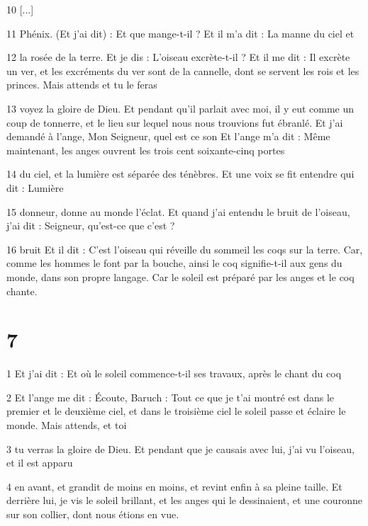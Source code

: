 \par 10 [...]

\par 11 Phénix. (Et j'ai dit) : Et que mange-t-il ? Et il m'a dit : La manne du ciel et

\par 12 la rosée de la terre. Et je dis : L'oiseau excrète-t-il ? Et il me dit : Il excrète un ver, et les excréments du ver sont de la cannelle, dont se servent les rois et les princes. Mais attends et tu le feras

\par 13 voyez la gloire de Dieu. Et pendant qu'il parlait avec moi, il y eut comme un coup de tonnerre, et le lieu sur lequel nous nous trouvions fut ébranlé. Et j'ai demandé à l'ange, Mon Seigneur, quel est ce son Et l'ange m'a dit : Même maintenant, les anges ouvrent les trois cent soixante-cinq portes

\par 14 du ciel, et la lumière est séparée des ténèbres. Et une voix se fit entendre qui dit : Lumière

\par 15 donneur, donne au monde l'éclat. Et quand j'ai entendu le bruit de l'oiseau, j'ai dit : Seigneur, qu'est-ce que c'est ?

\par 16 bruit Et il dit : C'est l'oiseau qui réveille du sommeil les coqs sur la terre. Car, comme les hommes le font par la bouche, ainsi le coq signifie-t-il aux gens du monde, dans son propre langage. Car le soleil est préparé par les anges et le coq chante.

\chapter{7}

\par 1 Et j'ai dit : Et où le soleil commence-t-il ses travaux, après le chant du coq

\par 2 Et l'ange me dit : Écoute, Baruch : Tout ce que je t'ai montré est dans le premier et le deuxième ciel, et dans le troisième ciel le soleil passe et éclaire le monde. Mais attends, et toi

\par 3 tu verras la gloire de Dieu. Et pendant que je causais avec lui, j'ai vu l'oiseau, et il est apparu

\par 4 en avant, et grandit de moins en moins, et revint enfin à sa pleine taille. Et derrière lui, je vis le soleil brillant, et les anges qui le dessinaient, et une couronne sur son collier, dont nous étions en vue.

